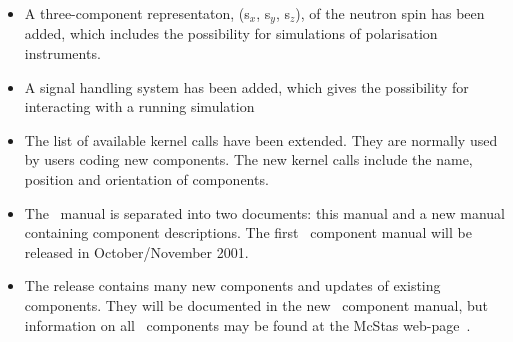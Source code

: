 \begin{itemize}
\item A three-component representaton, (s$_x$, s$_y$, s$_z$), of the neutron spin has been added, 
which includes the possibility for simulations of polarisation instruments.
\item A signal handling system has been added, which gives the possibility for interacting with a
running simulation
\item The list of available kernel calls have been extended. They are normally used by users coding
new components. The new kernel calls include the name, position and orientation of components.
\item The \MCS\ manual is separated into two documents: this manual and a new manual containing
component descriptions. The first \MCS\ component manual will be released in October/November 2001.
\item The release contains many new components and updates of existing components. They will be 
documented in the new \MCS\ component manual, but information on all \MCS\ components may be found 
at the McStas web-page~\cite{mcstas_webpage}.
\end{itemize} 







